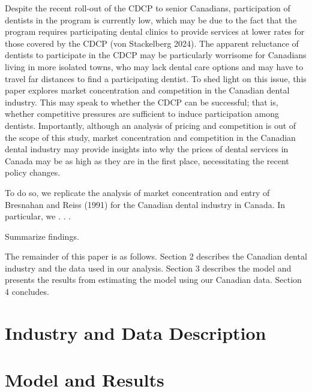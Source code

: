 \documentclass[a4paper,11pt]{article}
\begin{document}
Despite the recent roll-out of the CDCP to senior Canadians, participation of dentists in the program is currently low, which may be due to the fact that the program requires participating dental clinics to provide services at lower rates for those covered by the CDCP (von Stackelberg 2024). The apparent reluctance of dentists to participate in the CDCP may be particularly worrisome for Canadians living in more isolated towns, who may lack dental care options and may have to travel far distances to find a participating dentist. To shed light on this issue, this paper explores market concentration and competition in the Canadian dental industry. This may speak to whether the CDCP can be successful; that is, whether competitive pressures are sufficient to induce participation among dentists. Importantly, although an analysis of pricing and competition is out of the scope of this study, market concentration and competition in the Canadian dental industry may provide insights into why the prices of dental services in Canada may be as high as they are in the first place, necessitating the recent policy changes.

To do so, we replicate the analysis of market concentration and entry of Bresnahan and Reiss (1991) for the Canadian dental industry in Canada. In particular, we . . .

Summarize findings.

The remainder of this paper is as follows. Section 2 describes the Canadian dental industry and the data used in our analysis. Section 3 describes the model and presents the results from estimating the model using our Canadian data. Section 4 concludes.

\section{Industry and Data Description}

\section{Model and Results}
\end{document}
